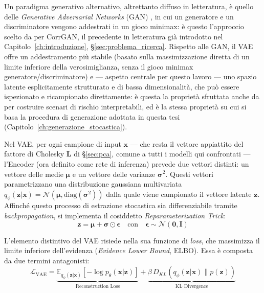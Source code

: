 Un paradigma generativo alternativo, altrettanto diffuso in letteratura, è quello delle \emph{Generative Adversarial Networks} (GAN) \citep{goodfellow2016gantutorial}, in cui un generatore e un discriminatore vengono addestrati in un gioco minimax: è questo l'approccio scelto da \citet{marti2019corrgan} per CorrGAN, il precedente in letteratura già introdotto nel Capitolo~\ref{ch:introduzione}, \S\ref{sec:problema_ricerca}. Rispetto alle GAN, il VAE offre un addestramento più stabile (basato sulla massimizzazione diretta di un limite inferiore della verosimiglianza, senza il gioco minimax generatore/discriminatore) e --- aspetto centrale per questo lavoro --- uno spazio latente esplicitamente strutturato e di bassa dimensionalità, che può essere ispezionato e ricampionato direttamente: è questa la proprietà sfruttata anche da \citet{caprioli2024ptfvae} per costruire scenari di rischio interpretabili, ed è la stessa proprietà su cui si basa la procedura di generazione adottata in questa tesi (Capitolo~\ref{ch:generazione_stocastica}).

Nel VAE, per ogni campione di input $\mathbf{x}$ --- che resta il vettore appiattito del fattore di Cholesky $\mathbf{L}$ di \S\ref{sec:pca}, comune a tutti i modelli qui confrontati --- l'Encoder (ora definito come rete di inferenza) prevede due vettori distinti: un vettore delle medie $\boldsymbol{\mu}$ e un vettore delle varianze $\boldsymbol{\sigma}^2$. Questi vettori parametrizzano una distribuzione gaussiana multivariata $q_{\phi}(\mathbf{z}|\mathbf{x}) = \mathcal{N}(\boldsymbol{\mu}, \text{diag}(\boldsymbol{\sigma}^2))$ dalla quale viene campionato il vettore latente $\mathbf{z}$. Affinché questo processo di estrazione stocastica sia differenziabile tramite \emph{backpropagation}, si implementa il cosiddetto \emph{Reparameterization Trick}:
\begin{equation}
\mathbf{z} = \boldsymbol{\mu} + \boldsymbol{\sigma} \odot \boldsymbol{\epsilon} \quad \text{con} \quad \boldsymbol{\epsilon} \sim \mathcal{N}(\mathbf{0}, \mathbf{I})
\end{equation}

L'elemento distintivo del VAE risiede nella sua funzione di \emph{loss}, che massimizza il limite inferiore dell'evidenza (\emph{Evidence Lower Bound}, ELBO). Essa è composta da due termini antagonisti:
\begin{equation}
\mathcal{L}_{\text{VAE}} = \underbrace{\mathbb{E}_{q_{\phi}(\mathbf{z}|\mathbf{x})} [-\log p_{\theta}(\mathbf{x}|\mathbf{z})]}_{\text{Reconstruction Loss}} + \underbrace{\beta \, D_{KL}(q_{\phi}(\mathbf{z}|\mathbf{x}) \parallel p(\mathbf{z}))}_{\text{KL Divergence}}
\end{equation}

